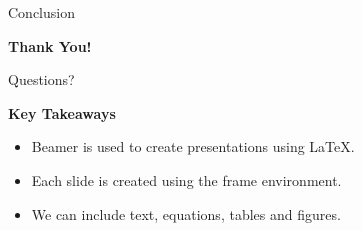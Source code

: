 \documentclass[11pt,aspectratio=43]{beamer}
\begin{document}
\begin{frame}{Conclusion}
  \begin{center}
    \vspace{0.2cm}
    {\LARGE\bfseries Thank You!}\par
    \vspace{0.35cm}
    {\large Questions?}
  \end{center}

  \vspace{0.45cm}
  \textbf{Key Takeaways}
  \begin{itemize}
    \item Beamer is used to create presentations using LaTeX.
    \item Each slide is created using the frame environment.
    \item We can include text, equations, tables and figures.
  \end{itemize}
\end{frame}
\end{document}
